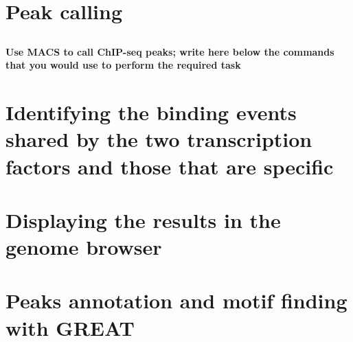 \documentclass[12pt, a4paper]{article}
\begin{document}
\section{Peak calling}

\subsection{}
\textbf{Use MACS to call ChIP-seq peaks; write here below the commands that you would use to perform the required task}

\section{Identifying the binding events shared by the two transcription factors and those that are specific}

\section{Displaying the results in the genome browser}

\section{Peaks annotation and motif finding with GREAT}
\end{document}
